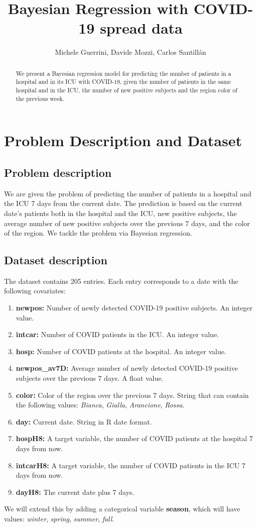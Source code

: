 \documentclass[12pt,a4paper]{article}
\title{Bayesian Regression with COVID-19 spread data}
\author{Michele Guerrini, Davide Mozzi, Carlos Santillán}
\theoremstyle{definition}
\theoremstyle{remark}
\begin{document}
	\maketitle
	\begin{abstract}
		We present a Bayesian regression model for predicting the number of patients in a hospital and in its ICU with COVID-19, given the number of patients in the same hospital and in the ICU, the number of new positive subjects and the region color of the previous week.
	\end{abstract}
	
	\tableofcontents
	\newpage
	\section{Problem Description and Dataset}
	\subsection{Problem description}
	We are given the problem of predicting the number of patients in a hospital and the ICU 7 days from the current date. The prediction is based on the current date's patients both in the hospital and the ICU, new positive subjects, the average number of new positive subjects over the previous 7 days, and the color of the region. We tackle the problem via Bayesian regression.
	\subsection{Dataset description}
	The dataset contains 205 entries. Each entry corresponds to a date with the following covariates:
	\begin{enumerate}
		\item \textbf{newpos:} Number of newly detected COVID-19 positive subjects. An integer value.
		\item \textbf{intcar:} 	Number of COVID patients in the ICU. An integer value.
		\item \textbf{hosp:} Number of COVID patients at the hospital. An integer value.
		\item \textbf{newpos\_av7D:} Average number of newly detected COVID-19 positive subjects over the previous 7 days. A float value.
		\item \textbf{color:} Color of the region over the previous 7 days. String that can contain the following values: \textit{Bianca}, \textit{Gialla}, \textit{Arancione}, \textit{Rossa}.
		\item \textbf{day:} Current date. String in R date format.
		\item \textbf{hospH8:} A target variable, the number of COVID patients at the hospital 7 days from now.
		\item \textbf{intcarH8:} A target variable, the number of COVID patients in the ICU 7 days from now.
		\item \textbf{dayH8:} The current date plus 7 days. 
	\end{enumerate}
	We will extend this by adding a categorical variable \textbf{season}, which will have values: \textit{winter}, \textit{spring}, \textit{summer}, \textit{fall}.
\end{document}
